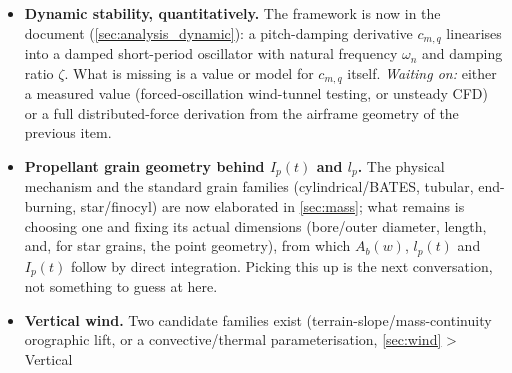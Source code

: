 \documentclass[10pt]{extarticle}
\numberwithin{equation}{subsection}
\begin{document}
\begin{itemize}
    $X_{cp}=\sum_iC_{N\alpha,i}X_i/\sum_iC_{N\alpha,i}$ --- so that $l_1(\alpha,M)$ is
    \emph{computed} from the airframe rather than read from a table, and an air brake enters as a
    switchable change to $C_A$ and to the CoP. That last point of entry is already fixed by the
    structure of \autoref{sec:aero}: whatever a control surface does, it does by perturbing
    $C_x,C_z,C_m$ or $l_1$, so what this item is waiting on is the airframe and the deflection law
    --- not somewhere to put them. The air brake of \autoref{sec:airbrake} is that entry point
    exercised \emph{without} an airframe behind it: a bare drag area added to $A_x$, which is
    precisely why it needs none of the build-up above and why it cannot say anything about the
    normal force or the centre of pressure. The original Barrowman formulas are subsonic
    linear-theory results and would need a Mach correction (Prandtl--Glauert or, in the linear
    supersonic regime, Busemann theory) to extend past low subsonic speed.
    \emph{Waiting on:} an actual airframe --- nose shape, body diameter/length and any boat-tail,
    and fin planform (root/tip chord, span, sweep, thickness, count) --- which this document does
    not yet fix anywhere.
    \item \textbf{Dynamic stability, quantitatively.} The framework is now in the document
    (\autoref{sec:analysis_dynamic}): a pitch-damping derivative $c_{m,q}$ linearises into a
    damped short-period oscillator with natural frequency $\omega_n$ and damping ratio $\zeta$.
    What is missing is a value or model for $c_{m,q}$ itself. \emph{Waiting on:} either a measured
    value (forced-oscillation wind-tunnel testing, or unsteady CFD) or a full distributed-force
    derivation from the airframe geometry of the previous item.
    \item \textbf{Propellant grain geometry behind $I_p(t)$ and $l_p$.} The physical mechanism and
    the standard grain families (cylindrical/BATES, tubular, end-burning, star/finocyl) are now
    elaborated in \autoref{sec:mass}; what remains is choosing one and fixing its actual
    dimensions (bore/outer diameter, length, and, for star grains, the point geometry), from which
    $A_b(w)$, $l_p(t)$ and $I_p(t)$ follow by direct integration. Picking this up is the next
    conversation, not something to guess at here.
    \item \textbf{Vertical wind.} Two candidate families exist (terrain-slope/mass-continuity
    orographic lift, or a convective/thermal parameterisation, \autoref{sec:wind} > Vertical

\end{itemize}
\end{document}
